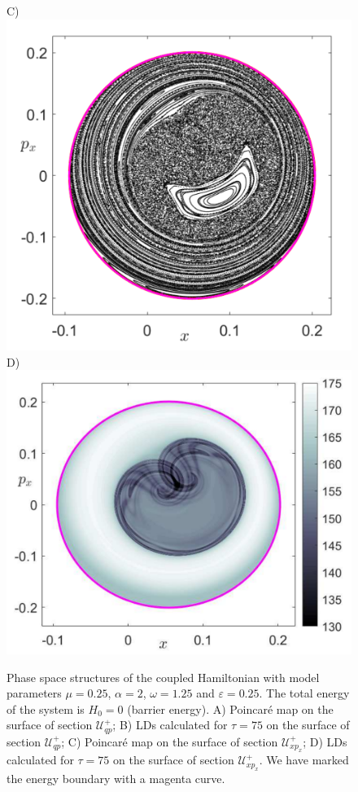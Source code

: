 \documentclass{ws-ijbc}
\begin{document}
\begin{figure}[!ht]
\begin{center}
		C)\includegraphics[scale=0.42]{fig10c}
		D)\includegraphics[scale=0.42]{fig10d}
	\end{center}

	\caption{Phase space structures of the coupled Hamiltonian with model parameters $\mu = 0.25$, $\alpha = 2$, $\omega = 1.25$ and $\varepsilon = 0.25$. The total energy of the system is $H_0 = 0$ (barrier energy). A) Poincar\'e map on the surface of section $\mathcal{U}^{+}_{qp}$; B) LDs calculated for $\tau = 75$ on the surface of section $\mathcal{U}^{+}_{qp}$; C) Poincar\'e map on the surface of section $\mathcal{U}^{+}_{xp_x}$; D) LDs calculated for $\tau = 75$ on the surface of section $\mathcal{U}^{+}_{xp_x}$. We have marked the energy boundary with a magenta curve.}
	\label{ps_vs_ld_1}
\end{figure}
\end{document}
